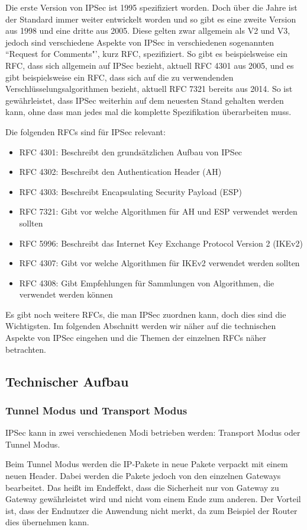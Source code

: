 \documentclass[12pt]{scrartcl}
\begin{document}
Die erste Version von IPSec ist 1995 spezifiziert worden. Doch über die Jahre ist der Standard immer weiter entwickelt worden und so gibt es eine zweite Version aus 1998 und eine dritte aus 2005. Diese gelten zwar allgemein als V2 und V3, jedoch sind verschiedene Aspekte von IPSec in verschiedenen sogenannten ``Request for Comments"', kurz RFC, spezifiziert. So gibt es beispielsweise ein RFC, dass sich allgemein auf IPSec bezieht, aktuell RFC 4301 aus 2005, und es gibt beispielsweise ein RFC, dass sich auf die zu verwendenden Verschlüsselungsalgorithmen bezieht, aktuell RFC 7321 bereits aus 2014. So ist gewährleistet, dass IPSec weiterhin auf dem neuesten Stand gehalten werden kann, ohne dass man jedes mal die komplette Spezifikation überarbeiten muss.

Die folgenden RFCs sind für IPSec relevant:
\begin{itemize}
\item RFC 4301: Beschreibt den grundsätzlichen Aufbau von IPSec
\item RFC 4302: Beschreibt den Authentication Header (AH)
\item RFC 4303: Beschreibt Encapsulating Security Payload (ESP)
\item RFC 7321: Gibt vor welche Algorithmen für AH und ESP verwendet werden sollten
\item RFC 5996: Beschreibt das Internet Key Exchange Protocol Version 2 (IKEv2)
\item RFC 4307: Gibt vor welche Algorithmen für IKEv2 verwendet werden sollten
\item RFC 4308: Gibt Empfehlungen für Sammlungen von Algorithmen, die verwendet werden können
\end{itemize}
Es gibt noch weitere RFCs, die man IPSec zuordnen kann, doch dies sind die Wichtigsten. Im folgenden Abschnitt werden wir näher auf die technischen Aspekte von IPSec eingehen und die Themen der einzelnen RFCs näher betrachten.

\subsection{Technischer Aufbau}
\subsubsection{Tunnel Modus und Transport Modus}
IPSec kann in zwei verschiedenen Modi betrieben werden: Transport Modus oder Tunnel Modus. 

Beim Tunnel Modus werden die IP-Pakete in neue Pakete verpackt mit einem neuen Header. Dabei werden die Pakete jedoch von den einzelnen Gateways bearbeitet. Das heißt im Endeffekt, dass die Sicherheit nur von Gateway zu Gateway gewährleistet wird und nicht vom einem Ende zum anderen. Der Vorteil ist, dass der Endnutzer die Anwendung nicht merkt, da zum Beispiel der Router dies übernehmen kann. 
\end{document}

